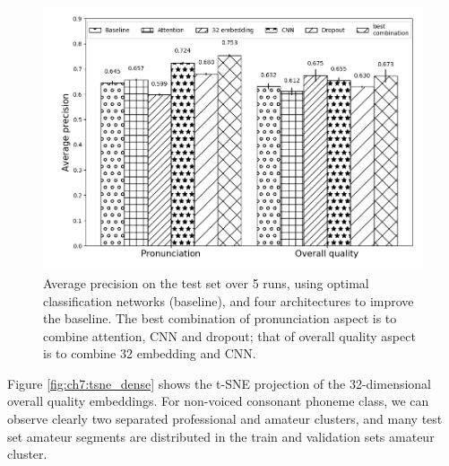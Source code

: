 \begin{figure}[ht!]
    \centering
    \includegraphics[width=\textwidth]{figs/ch7/improved_test_results_dlfm.png}
    \caption{Average precision on the test set over 5 runs, using optimal classification networks (baseline), and four architectures to improve the baseline. The best combination of pronunciation aspect is to combine attention, CNN and dropout; that of overall quality aspect is to combine 32 embedding and CNN.}
    \label{fig:ch7:improved_test}
\end{figure}

Figure \ref{fig:ch7:tsne_dense} shows the \gls{t-SNE} projection of the 32-dimensional overall quality embeddings. For non-voiced consonant phoneme class, we can observe clearly two separated professional and amateur clusters, and many test set amateur segments are distributed in the train and validation sets amateur cluster. 

